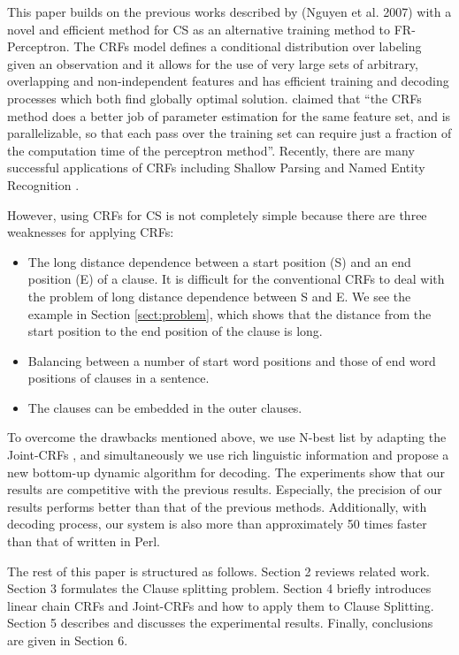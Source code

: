\documentclass[english]{jnlp_1.4}
\begin{document}
This paper builds on the previous works described by (Nguyen et
al. 2007) with a novel and efficient method for CS as an
alternative training method to FR-Perceptron. The CRFs model
\cite{Lafferty2001} defines a conditional distribution over
labeling given an observation and it allows for the use of very
large sets of arbitrary, overlapping and non-independent features
and has efficient training and decoding processes which both find
globally optimal solution. \cite{Roark2004} claimed that ``the
CRFs method does a better job of parameter estimation for the same
feature set, and is parallelizable, so that each pass over the
training set can require just a fraction of the computation time
of the perceptron method''. Recently, there are many successful
applications of CRFs including Shallow Parsing \cite{Sha2003} and
Named Entity Recognition \cite{McCallum2003}.

However, using CRFs for CS is not completely simple because there
are three weaknesses for applying CRFs:
\begin{itemize}
\item The long distance dependence between a start position (S) and an end position (E) of a clause. It is
difficult for the conventional CRFs to deal with the problem of long
distance dependence between S and E. We see the example in Section
\ref{sect:problem}, which shows that the distance from the start
position to the end position of the clause is long.
\item Balancing between a number of start word positions and those of end
word positions of clauses in a sentence.
\item The clauses can be embedded in the outer clauses.
\end{itemize}
To overcome the drawbacks mentioned above, we use N-best list by
adapting the Joint-CRFs \cite{Shi2007}, and simultaneously we use
rich linguistic information and propose a new bottom-up dynamic
algorithm for decoding. The experiments show that our results are
competitive with the previous results. Especially, the precision
of our results performs better than that of the previous methods.
Additionally, with decoding process, our system is also more than
approximately 50 times faster than that of \cite{Carreras2005}
written in Perl.

The rest of this paper is structured as follows. Section 2 reviews
related work. Section 3 formulates the Clause splitting problem.
Section 4 briefly introduces linear chain CRFs and Joint-CRFs and
how to apply them to Clause Splitting. Section 5 describes and
discusses the experimental results. Finally, conclusions are given
in Section 6.
\end{document}

